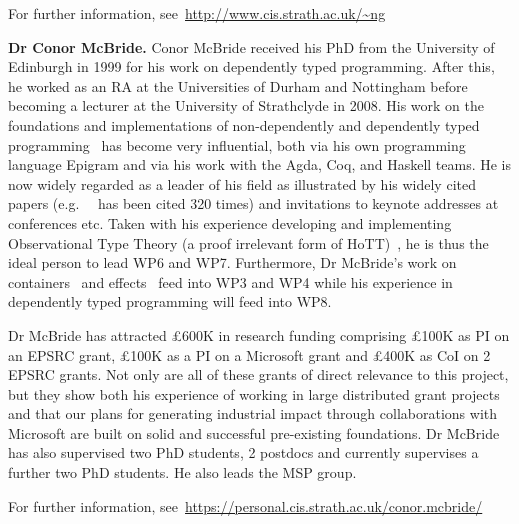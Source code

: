 \documentclass[a4paper,11pt]{article}
\newcommand{\eg}{{e.g.}\ }
\begin{document}





For further information, see~\url{http://www.cis.strath.ac.uk/~ng}

\textbf{Dr Conor McBride.} Conor McBride received his PhD from the
University of Edinburgh in 1999 for his work on dependently typed
programming. After this, he worked as an RA at the Universities of
Durham and Nottingham before becoming a lecturer at the University of
Strathclyde in 2008. His work on the foundations and implementations
of non-dependently and dependently typed
programming~\cite{viewftl,alti:ott-conf,easy}
has become very influential, both via his own programming language
Epigram and via his work with the Agda, Coq, and Haskell teams. He is
now widely regarded as a leader of his field as illustrated by his
widely cited papers (\eg ~\cite{viewftl} has been cited 320 times) and
invitations to keynote addresses at conferences etc. Taken with his
experience developing and implementing Observational Type Theory (a
proof irrelevant form of HoTT)~\cite{alti:ott-conf}, he is
thus the ideal person to lead WP6 and WP7. Furthermore, Dr McBride's
work on containers~\cite{alti:mpc04} and
effects~\cite{conor:frank} feed into WP3 and WP4 while his experience
in dependently typed programming will feed into WP8.

Dr McBride has attracted \pounds 600K in research funding comprising
\pounds 100K as PI on an EPSRC grant, \pounds 100K as a PI on a
Microsoft grant and \pounds 400K as CoI on 2 EPSRC grants. Not only
are all of these grants of direct relevance to this project, but they
show both his experience of working in large distributed grant
projects and that our plans for generating industrial impact through
collaborations with Microsoft are built on solid and successful
pre-existing foundations. Dr McBride has also supervised two PhD
students, 2 postdocs and currently supervises a further two PhD students. He also
leads the MSP group.

For further information,
see~\url{https://personal.cis.strath.ac.uk/conor.mcbride/}
\end{document}
